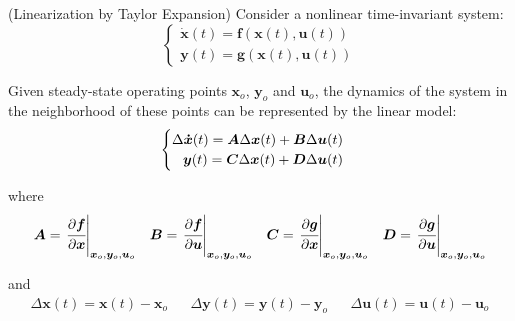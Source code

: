 \documentclass[a4paper,11pt]{book}
\numberwithin{figure}{chapter}
\numberwithin{equation}{chapter}
\numberwithin{table}{chapter}
\newtheorem{theorem}{Theorem}[chapter]
\theoremstyle{definition}
\newcounter{boxed-theorem}
\newenvironment{boxed-theorem}[1]
{\begin{shaded} \begin{theorem}{#1}}
{\end{theorem} \end{shaded}}
\newcounter{boxed-definition}
\begin{document}
\begin{boxed-theorem}{(Linearization by Taylor Expansion)} \label{th:linearization}
	Consider a nonlinear time-invariant system:
	\begin{equation} \label{eq:SSRepr03}
	\begin{cases}
		\dot{\bm{x}}(t) = \bm{f}(\bm{x}(t), \bm{u}(t)) \\
		\bm{y}(t) = \bm{g}(\bm{x}(t), \bm{u}(t))
	\end{cases}
	\end{equation}
	
\noindent Given steady-state operating points $\bm{x}_o$, $\bm{y}_o$ and $\bm{u}_o$, the dynamics of the system in the neighborhood of these points can be represented by the linear model: 
	\begin{align}
	\begin{cases}
		\Delta \bm{\dot{x}}(t) = \bm{A}\Delta \bm{x}(t) + \bm{B}\Delta \bm{u}(t) & \\
		\hfill \bm{y}(t) = \bm{C}\Delta \bm{x}(t) + \bm{D}\Delta \bm{u}(t) &
	\end{cases}
	\end{align}
	
	\noindent where
	\begin{equation}
	\begin{matrix}
		\bm{A} = \left. \cfrac{\partial \bm{f}}{\partial \bm{x}} \right|_{\bm{x}_o, \bm{y}_o, \bm{u}_o} & \bm{B} = \left. \cfrac{\partial \bm{f}}{\partial \bm{u}} \right|_{\bm{x}_o, \bm{y}_o, \bm{u}_o} & \bm{C} = \left. \cfrac{\partial \bm{g}}{\partial \bm{x}} \right|_{\bm{x}_o, \bm{y}_o, \bm{u}_o} & \bm{D} = \left. \cfrac{\partial \bm{g}}{\partial \bm{u}} \right|_{\bm{x}_o, \bm{y}_o, \bm{u}_o} 
	\end{matrix}
	\end{equation}
	
	\noindent and
	\begin{equation}
	\begin{matrix}
		\Delta \bm{x}(t) = \bm{x}(t) - \bm{x}_o & & \Delta \bm{y}(t) = \bm{y}(t) - \bm{y}_o & & \Delta \bm{u}(t) = \bm{u}(t) - \bm{u}_o
	\end{matrix}
	\end{equation}
\end{boxed-theorem}
\end{document}
